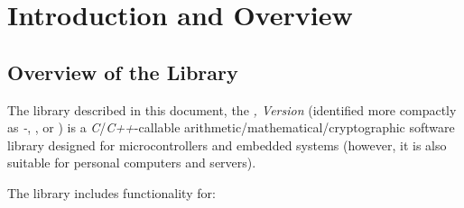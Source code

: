 \chapter{Introduction and Overview}
\label{ciov0}

\section{Overview of the Library}
\label{ciov0:sdpr0}

The library described in this 
document, the \emph{\productbasenamelong{}, Version 
\productversion{}} (identified more compactly as 
\emph{\productbasenameshort{}-\productversion{}}, 
\emph{\productbasenameshort{}}, or 
\emph{\productbasenameultrashort{}}) is a 
\emph{C}/\emph{C++}-callable 
arith\-me\-tic/\-math\-e\-mat\-i\-cal/\-cryp\-to\-graph\-ic 
software library designed for microcontrollers and embedded
systems (however, it is also suitable for personal computers
and servers).

The library includes functionality for: 

